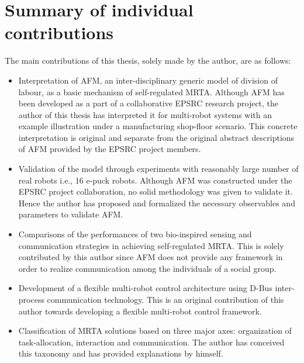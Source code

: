 \section{Summary of individual contributions}
The main contributions of this thesis, solely made by the author, are as follows:
\begin{itemize}
\item Interpretation of AFM, an inter-disciplinary generic model of division of labour, as a basic mechanism of self-regulated MRTA. Although AFM has been developed as a part of a collaborative EPSRC research project, the author of this thesis has interpreted it for multi-robot systems with an example illustration under a manufacturing shop-floor scenario. This concrete interpretation is original and separate from the original abstract descriptions of AFM provided by the EPSRC project members.
\item Validation of the model through experiments with reasonably large number of real robots i.e., 16 e-puck robots. Although  AFM was constructed under the EPSRC project collaboration, no solid methodology was given to validate it. Hence the author has proposed and formalized the necessary observables and parameters to validate AFM. 
\item Comparisons of the performances of two bio-inspired sensing and communication strategies in achieving self-regulated MRTA. This is solely contributed by this author since AFM does not provide any framework in order to realize communication among the individuals of a social group.
\item Development of a flexible multi-robot control architecture using D-Bus inter-process communication technology. This is an original contribution of this author towards developing a flexible multi-robot control framework.
\item Classification of MRTA solutions based on three major axes: organization of task-allocation, interaction and communication. The  author has conceived this taxonomy and has provided explanations by himself. 
\end{itemize}
